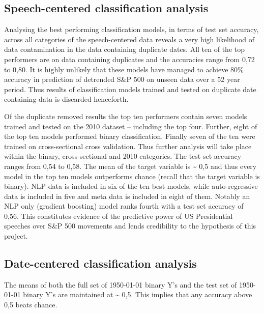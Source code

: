 \documentclass[11pt,preprint, authoryear]{elsarticle}
\numberwithin{equation}{section}
\numberwithin{figure}{section}
\numberwithin{table}{section}
\begin{document}
\hypertarget{speech-centered-classification-analysis}{%
\subsection{\texorpdfstring{Speech-centered classification analysis
\label{speech-centered}}{Speech-centered classification analysis }}\label{speech-centered-classification-analysis}}

Analysing the best performing classification models, in terms of test
set accuracy, across all categories of the speech-centered data reveals
a very high likelihood of data contamination in the data containing
duplicate dates. All ten of the top performers are on data containing
duplicates and the accuracies range from 0,72 to 0,80. It is highly
unlikely that these models have managed to achieve 80\% accuracy in
prediction of detrended S\&P 500 on unseen data over a 52 year period.
Thus results of classification models trained and tested on duplicate
date containing data is discarded henceforth.

Of the duplicate removed results the top ten performers contain seven
models trained and tested on the 2010 dataset -- including the top four.
Further, eight of the top ten models performed binary classification.
Finally seven of the ten were trained on cross-sectional cross
validation. Thus further analysis will take place within the binary,
cross-sectional and 2010 categories. The test set accuracy ranges from
0,54 to 0,58. The mean of the target variable is \textasciitilde{} 0,5
and thus every model in the top ten models outperforms chance (recall
that the target variable is binary). NLP data is included in six of the
ten best models, while auto-regressive data is included in five and meta
data is included in eight of them. Notably an NLP only (gradient
boosting) model ranks fourth with a test set accuracy of 0,56. This
constitutes evidence of the predictive power of US Presidential speeches
over S\&P 500 movements and lends credibility to the hypothesis of this
project.

\hypertarget{date-centered-classification-analysis}{%
\subsection{Date-centered classification
analysis}\label{date-centered-classification-analysis}}

The means of both the full set of 1950-01-01 binary Y's and the test set
of 1950-01-01 binary Y's are maintained at \textasciitilde{} 0,5. This
implies that any accuracy above 0,5 beats chance.
\end{document}
